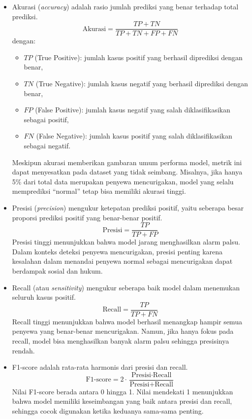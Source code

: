     \begin{itemize}
        \item {Akurasi} (\textit{accuracy}) adalah rasio jumlah prediksi yang benar terhadap total prediksi.
        \[
        \text{Akurasi} = \frac{TP + TN}{TP + TN + FP + FN}
        \]
        dengan:
        \begin{itemize}
            \item $TP$ (True Positive): jumlah kasus positif yang berhasil diprediksi dengan benar,
            \item $TN$ (True Negative): jumlah kasus negatif yang berhasil diprediksi dengan benar,
            \item $FP$ (False Positive): jumlah kasus negatif yang salah diklasifikasikan sebagai positif,
            \item $FN$ (False Negative): jumlah kasus positif yang salah diklasifikasikan sebagai negatif.
        \end{itemize}
        Meskipun akurasi memberikan gambaran umum performa model, metrik ini dapat menyesatkan pada dataset yang tidak seimbang. Misalnya, jika hanya 5\% dari total data merupakan penyewa mencurigakan, model yang selalu memprediksi ``normal'' tetap bisa memiliki akurasi tinggi.
    
        \item {Presisi} (\textit{precision}) mengukur ketepatan prediksi positif, yaitu seberapa besar proporsi prediksi positif yang benar-benar positif.
        \[
        \text{Presisi} = \frac{TP}{TP + FP}
        \]
        Presisi tinggi menunjukkan bahwa model jarang menghasilkan alarm palsu. Dalam konteks deteksi penyewa mencurigakan, presisi penting karena kesalahan dalam menandai penyewa normal sebagai mencurigakan dapat berdampak sosial dan hukum.
    
        \item {Recall} (atau \textit{sensitivity}) mengukur seberapa baik model dalam menemukan seluruh kasus positif.
        \[
        \text{Recall} = \frac{TP}{TP + FN}
        \]
        Recall tinggi menunjukkan bahwa model berhasil menangkap hampir semua penyewa yang benar-benar mencurigakan. Namun, jika hanya fokus pada recall, model bisa menghasilkan banyak alarm palsu sehingga presisinya rendah.
    
        \item {F1-score} adalah rata-rata harmonis dari presisi dan recall.
        \[
        \text{F1-score} = 2 \cdot \frac{\text{Presisi} \cdot \text{Recall}}{\text{Presisi} + \text{Recall}}
        \]
        Nilai F1-score berada antara 0 hingga 1. Nilai mendekati 1 menunjukkan bahwa model memiliki keseimbangan yang baik antara presisi dan recall, sehingga cocok digunakan ketika keduanya sama-sama penting.
    \end{itemize}
    
